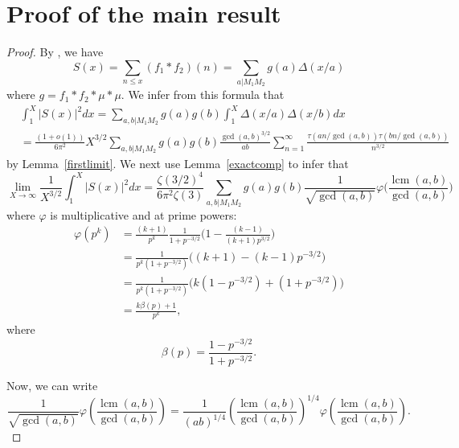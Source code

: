 \documentclass[a4paper,12pt, reqn0]{amsart}
\theoremstyle{remark}
\newcommand{\bt}{\beta}
\DeclareMathOperator{\lcm}{lcm}
\begin{document}
\section{Proof of the main result}
\begin{proof}
  By \cite[Theorem 1.4]{Aymone*22}, we have
  \begin{equation*}
      S(x)=\sum_{n\le x}(f_1\ast f_2)(n)
      =
      \sum_{a| M_1M_2}g(a)\Delta(x/a)
  \end{equation*}
  where $g=f_1\ast f_2\ast\mu\ast\mu$. We infer from this formula that
  \begin{align*}
      &\int_1^X|S(x)|^2dx
      =
      \sum_{a,b| M_1M_2}g(a)g(b)
      \int_1^X \Delta(x/a)\Delta(x/b)dx
      \\&=
      \frac{(1+o(1))}{6\pi^2}X^{3/2}
      \sum_{a,b|M_1M_2}g(a)g(b)
      \frac{\gcd(a,b)^{3/2}}{ab}
      \sum_{n= 1}^\infty
      \frac{\tau(an/\gcd(a,b))\tau(bn/\gcd(a,b))}{n^{3/2}}
  \end{align*}
  by Lemma~\ref{firstlimit}. We next use Lemma~\ref{exactcomp} to infer that
  \begin{equation*}
      \lim_{X\to\infty}
      \frac{1}{X^{3/2}}\int_1^X|S(x)|^2dx
      =
      \frac{\zeta(3/2)^4}{6\pi^2\zeta(3)}
      \sum_{a,b| M_1M_2}g(a)g(b)
      \frac{1}{ \sqrt{\gcd(a,b)}}
      \varphi\biggl(\frac{\lcm(a,b)}{\gcd(a,b)}\biggr)
  \end{equation*}
  where $\varphi$ is multiplicative and at prime powers: 
\begin{equation}
\begin{split}
\label{fval}
\varphi(p^k) 
&= \frac{(k+1)}{p^{k}}\frac{1}{1+p^{-3/2}}
      \biggl(1-\frac{(k-1)}{(k+1)p^{3/2}}\biggr)\\ 
&= \frac{1}{p^{k} (1 + p^{-3/2})} \biggl(  (k+1) - (k-1)p^{-3/2} \biggr)    \\
&= \frac{1}{p^{k} (1 + p^{-3/2})} \biggl( k (1-p^{-3/2}) + (1 + p^{-3/2}) \biggr)\\
&=\frac{k \bt(p) + 1 }{p^{k}},
\end{split}
\end{equation}
where
$$
 \bt(p) = \frac{1-p^{-3/2}}{1 + p^{-3/2}}.
$$

Now, we can write
%
\begin{equation*}
\frac{1}{\sqrt{\gcd(a,b)}} \varphi\left( \frac{\lcm(a,b)}{\gcd(a,b)} \right)  = \frac{1}{(ab)^{1/4}} \left( \frac{\lcm(a,b)}{\gcd(a,b)} \right)^{1/4} \varphi\left( \frac{\lcm(a,b)}{\gcd(a,b)} \right). 
\end{equation*}


\end{proof}
\end{document}
